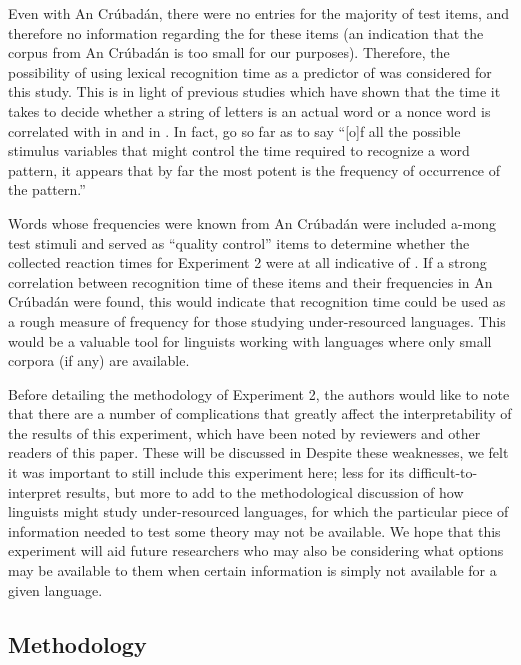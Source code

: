 \documentclass[output=paper,newtxmath,modfonts,nonflat,final]{langsci/langscibook}
\begin{document}
Even with An Crúbadán, there were no entries for the majority of test items, and therefore no information regarding the  for these items (an indication that the  corpus from An Crúbadán is too small for our purposes). Therefore, the possibility of using lexical recognition time as a predictor of  was considered for this study. This is in light of previous studies which have shown that the time it takes to decide whether a string of letters is an actual word or a nonce word is correlated with  in  \citep{brysbaert2011word} and in  \citep{baayen2006morphological}. In fact,  \citet{murray2004serial} go so far as to say “[o]f all the possible stimulus variables that might control the time required to recognize a word pattern, it appears that by far the most potent is the frequency of occurrence of the pattern.” 

Words whose frequencies were known from An Crúbadán were included a-mong test stimuli and served as “quality control” items to determine whether the collected reaction times for Experiment 2 were at all indicative of . If a strong correlation between recognition time of these items and their frequencies in An Crúbadán were found, this would indicate that recognition time could be used as a rough measure of frequency for those studying under-resourced languages. This would be a valuable tool for linguists working with languages where only small corpora (if any) are available.

Before detailing the methodology of Experiment 2, the authors would like to note that there are a number of complications that greatly affect the interpretability of the results of this experiment, which have been noted by reviewers and other readers of this paper. These will be discussed in  Despite these weaknesses, we felt it was important to still include this experiment here; less for its difficult-to-interpret results, but more to add to the methodological discussion of how linguists might study under-resourced languages, for which the particular piece of information needed to test some theory may not be available. We hope that this experiment will aid future researchers who may also be considering what options may be available to them when certain information is simply not available for a given language.

\subsection{Methodology}\label{sec:moeng:6.1}
\end{document}
